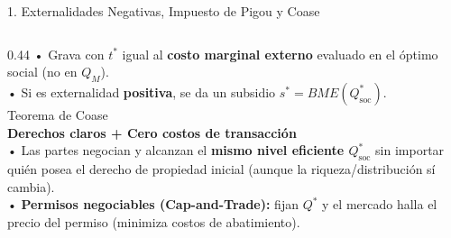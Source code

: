 \documentclass[aspectratio=169, 10pt]{beamer}
\begin{document}
\begin{frame}{1. Externalidades Negativas, Impuesto de Pigou y Coase}
\begin{columns}[T]
    \begin{column}{0.44\textwidth}
      {\scriptsize
        • Grava con \(t^*\) igual al \textbf{costo marginal externo} evaluado en el óptimo social (no en \(Q_M\)).\\
        • Si es externalidad \textbf{positiva}, se da un subsidio \(s^* = BME(Q^*_{\text{soc}})\).\\[4pt]
      }
      {\scriptsize\color{grisTexto}Teorema de Coase}\\[1pt]
      {\normalsize\color{azulPrincipal}\textbf{Derechos claros + Cero costos de transacción}}\\[4pt]
      {\scriptsize
        • Las partes negocian y alcanzan el \textbf{mismo nivel eficiente \(Q^*_{\text{soc}}\)} sin importar quién posea el derecho de propiedad inicial (aunque la riqueza/distribución sí cambia).\\
        • \textbf{Permisos negociables (Cap-and-Trade):} fijan \(Q^*\) y el mercado halla el precio del permiso (minimiza costos de abatimiento).
      }
    \end{column}
  \end{columns}

\end{frame}
\end{document}
